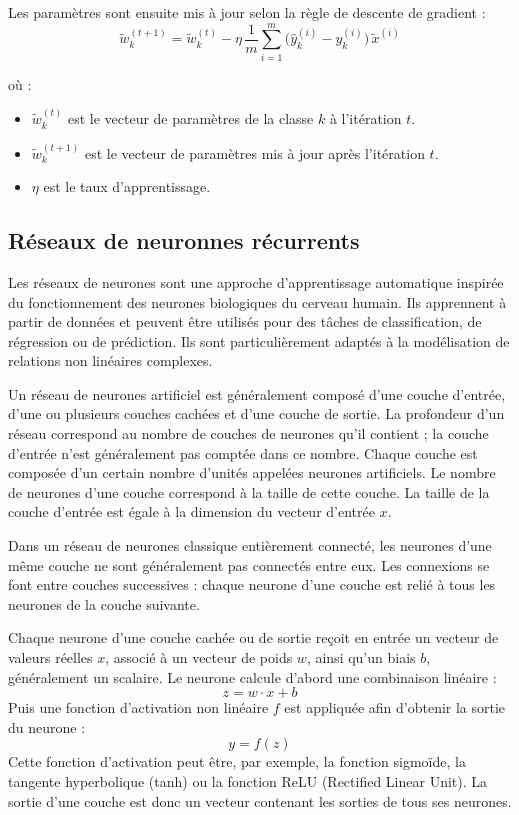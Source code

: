 \documentclass[12pt,a4paper]{report}
\begin{document}
Les paramètres sont ensuite mis à jour selon la règle de descente de gradient :
\[
\tilde{w}_k^{(t+1)}
= \tilde{w}_k^{(t)}
- \eta \, \frac{1}{m} \sum_{i=1}^{m} \big(\hat{y}_k^{(i)} - y_k^{(i)}\big)\, \tilde{x}^{(i)}
\]

où :
\begin{itemize}
	\item $\tilde{w}_k^{(t)}$ est le vecteur de paramètres de la classe $k$ à l’itération $t$.
	\item $\tilde{w}_k^{(t+1)}$ est le vecteur de paramètres mis à jour après l’itération $t$.
	\item $\eta$ est le taux d’apprentissage.
\end{itemize}

\subsection{Réseaux de neuronnes récurrents}
Les réseaux de neurones sont une approche d’apprentissage automatique inspirée du fonctionnement des neurones biologiques du cerveau humain. Ils apprennent à partir de données et peuvent être utilisés pour des tâches de classification, de régression ou de prédiction. Ils sont particulièrement adaptés à la modélisation de relations non linéaires complexes.

Un réseau de neurones artificiel est généralement composé d’une couche d’entrée, d’une ou plusieurs couches cachées et d’une couche de sortie. La profondeur d’un réseau correspond au nombre de couches de neurones qu’il contient ; la couche d’entrée n’est généralement pas comptée dans ce nombre. Chaque couche est composée d’un certain nombre d’unités appelées neurones artificiels. Le nombre de neurones d’une couche correspond à la taille de cette couche. La taille de la couche d’entrée est égale à la dimension du vecteur d’entrée $x$.

Dans un réseau de neurones classique entièrement connecté, les neurones d’une même couche ne sont généralement pas connectés entre eux. Les connexions se font entre couches successives : chaque neurone d’une couche est relié à tous les neurones de la couche suivante.

Chaque neurone d’une couche cachée ou de sortie reçoit en entrée un vecteur de valeurs réelles $x$, associé à un vecteur de poids $w$, ainsi qu’un biais $b$, généralement un scalaire. Le neurone calcule d’abord une combinaison linéaire :
\[
z=w \cdot x + b
\]
Puis une fonction d’activation non linéaire $f$ est appliquée afin d’obtenir la sortie du neurone :
\[
y=f(z)
\]
Cette fonction d’activation peut être, par exemple, la fonction sigmoïde, la tangente hyperbolique (tanh) ou la fonction ReLU (Rectified Linear Unit). La sortie d’une couche est donc un vecteur contenant les sorties de tous ses neurones.
\end{document}
